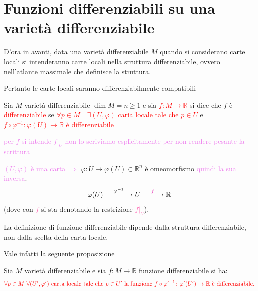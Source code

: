     \section{Funzioni differenziabili su una varietà differenziabile}
        \begin{osservazione}
        D'ora in avanti, data una varietà differenziabile $M$ quando si considerano carte locali si intenderanno 
        carte locali nella struttura differenziabile, ovvero nell'atlante massimale che definisce la struttura.

        Pertanto le carte locali saranno differenziabilmente compatibili
        \end{osservazione}
        \begin{definizione}
        \label{def:funzione_differenziabile_definita_su_una_varieta}
        \mbox{}

        Sia $M$ varietà differenziabile $\dim M =n \geq 1$ e sia \textcolor{red}{$f \colon M \to \mathbb{R}$} si dice che
        $f$ è \textcolor{red}{differenziabile} se \textcolor{red}{$\forall p \in M \quad \exists (U, \varphi)$ carta locale
        tale che $p \in U$} e \textcolor{red}{$f \circ \varphi^{-1} \colon \varphi(U) \to \mathbb{R}$ è differenziabile} 

        \textcolor{violet}{per $f$ si intende $f|_U$ non lo scriviamo esplicitamente per non rendere pesante la scrittura}
        \end{definizione}
        \begin{osservazione}
        \mbox{}
        
        \textcolor{violet}{$(U, \varphi)$ è una carta $\Rightarrow$} $\varphi \colon U \to \varphi(U) \subset \mathbb{R}^n$ è omeomorfismo \textcolor{violet}{quindi la sua inversa}.
        \[
        \varphi(U) \xrightarrow{\quad \varphi^{-1} \quad } U \xrightarrow{\quad \textcolor{hotpink}{f} \quad } \mathbb{R}
        \]
        (dove con \textcolor{hotpink}{$f$} si sta denotando la restrizione \textcolor{hotpink}{$f|_U$}).
        \end{osservazione}

        La definizione di funzione differenziabile dipende dalla struttura differenziabile, non dalla scelta della carta locale. 
        
        Vale infatti la seguente proposizione

        \begin{proposizione}
        \mbox{}

        Sia $M$ varietà differenziabile e sia $f \colon M \to \mathbb{R}$ funzione differenziabile si ha:
        \[
        \textcolor{red}{\forall p \in M \ \forall (U', \varphi') \text{ carta locale tale che } p \in U' \text{ la funzione } f \circ \varphi'^{-1} \colon \varphi'(U') \to \mathbb{R} \text{ è differenziabile.}}
        \]
        \end{proposizione}

